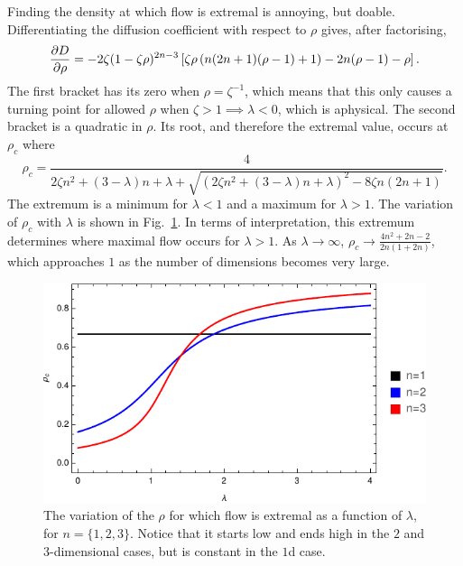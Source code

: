 Finding the density at which flow is extremal is annoying, but doable. Differentiating the diffusion
coefficient with respect to $\rho$ gives, after factorising,
\begin{equation}
 \frac{\partial D}{\partial \rho} = -2 \zeta (1-\zeta \rho )^{2 n-3} \left[ \zeta \rho  \left(n (2 n+1) (\rho-1)+1\right)-2 n (\rho-1)-\rho \right].
\end{equation}
The first bracket has its zero when $\rho=\zeta^{-1}$, which means that this only causes a turning point
for allowed $\rho$ when $\zeta>1 \implies \lambda<0$, which is aphysical. The second bracket is a quadratic in $\rho$. Its root, and therefore the extremal value, occurs at $\rho_c$ where
\begin{equation} \label{eq:critRho}
 \rho_c = \frac{4}{2 \zeta n^2+(3-\lambda) n+\lambda + \sqrt{\left(2 \zeta n^2+(3-\lambda) n+\lambda\right)^2-8 \zeta n (2 n+1)}}.
\end{equation}
The extremum is a minimum for $\lambda<1$ and a maximum for $\lambda>1$. The variation of $\rho_c$
with $\lambda$ is shown in Fig.~\ref{fig:criticalRho}. In terms of interpretation, this extremum determines where maximal flow occurs for $\lambda>1$. As $\lambda \rightarrow \infty$, 
$\rho_c \rightarrow \frac{4n^2+2n-2}{2n(1+2n)}$, which approaches $1$ as the number of dimensions
becomes very large. 
 \begin{figure}[h!]
 \caption[The variation of the density of maximal/minimal flow with $\lambda$.]{\label{fig:criticalRho} 
 The variation of the $\rho$ for which flow is extremal as a function of $\lambda$, for $n=\{1, 2, 3\}$. Notice that it starts low and ends high in the $2$ and $3$-dimensional cases, but is constant in
 the $1$d case.
 }
  \begin{center}
 \includegraphics[width=0.66\linewidth]{analytics/images/nDCriticalRho}
  \end{center}
\end{figure}

